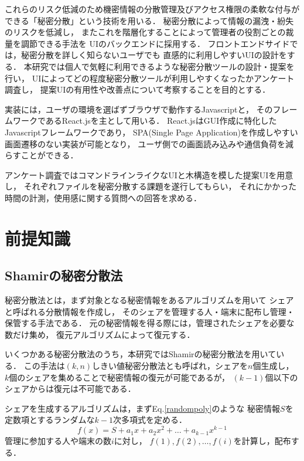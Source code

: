 \documentclass[twocolumn, fleqn, uplatex]{jsarticle}
\begin{document}
これらのリスク低減のため機密情報の分散管理及びアクセス権限の柔軟な付与が%
できる「秘密分散\cite{lit:nishikawa}」という技術を用いる．%
秘密分散によって情報の漏洩・紛失のリスクを低減し，%
またこれを階層化することによって管理者の役割ごとの裁量を調節できる手法を%
UIのバックエンドに採用する．%
フロントエンドサイドでは，秘密分散を詳しく知らないユーザでも%
直感的に利用しやすいUIの設計をする．%
本研究では個人で気軽に利用できるような秘密分散ツールの設計・提案を行い，%
UIによってどの程度秘密分散ツールが利用しやすくなったかアンケート調査し，%
提案UIの有用性や改善点について考察することを目的とする．

実装には，ユーザの環境を選ばずブラウザで動作するJavascriptと，%
そのフレームワークであるReact.jsを主として用いる．%
React.jsはGUI作成に特化したJavascriptフレームワークであり，%
SPA(Single Page Application)を作成しやすい画面遷移のない実装が可能となり，%
ユーザ側での画面読み込みや通信負荷を減らすことができる．%

アンケート調査ではコマンドラインライクなUIと木構造を模した提案UIを用意し，
それぞれファイルを秘密分散する課題を遂行してもらい，%
それにかかった時間の計測，使用感に関する質問への回答を求める．

\section{前提知識}
\subsection{Shamirの秘密分散法}
秘密分散法とは，まず対象となる秘密情報をあるアルゴリズムを用いて%
シェアと呼ばれる分散情報を作成し，%
そのシェアを管理する人・端末に配布し管理・保管する手法である．%
元の秘密情報を得る際には，管理されたシェアを必要な数だけ集め，%
復元アルゴリズムによって復元する．

いくつかある秘密分散法のうち，本研究ではShamirの秘密分散法\cite{lit:shamir}を用いている．%
この手法は$(k,n)$しきい値秘密分散法とも呼ばれ，シェアを$n$個生成し，%
$k$個のシェアを集めることで秘密情報の復元が可能であるが，%
$(k-1)$個以下のシェアからは復元は不可能である．

シェアを生成するアルゴリズムは，まずEq.\ref{randompoly}のような%
秘密情報$S$を定数項とするランダムな$k-1$次多項式を定める．
%
\begin{equation}
f(x) = S + a_{1}x + a_{2}x^{2} + \dots + a_{k-1}x^{k-1} \label{randompoly}
\end{equation}
%
管理に参加する人や端末の数$i$に対し，%
$f(1),f(2),\dots,f(i)$を計算し，配布する．
\end{document}
